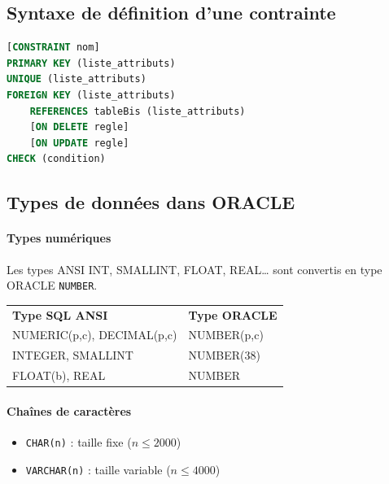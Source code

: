 \subsection*{Syntaxe de définition d’une contrainte}

\begin{sqlcodebox}
\begin{lstlisting}[language=SQL]
[CONSTRAINT nom]
PRIMARY KEY (liste_attributs)
UNIQUE (liste_attributs)
FOREIGN KEY (liste_attributs)
    REFERENCES tableBis (liste_attributs)
    [ON DELETE regle]
    [ON UPDATE regle]
CHECK (condition)
\end{lstlisting}
\end{sqlcodebox}


\subsection{Types de données dans ORACLE}

\paragraph{Types numériques}

Les types ANSI INT, SMALLINT, FLOAT, REAL… sont convertis en type ORACLE
\texttt{NUMBER}.

\begin{center}
\begin{tabular}{ll}
\textbf{Type SQL ANSI} & \textbf{Type ORACLE} \\
NUMERIC(p,c), DECIMAL(p,c) & NUMBER(p,c) \\
INTEGER, SMALLINT & NUMBER(38) \\
FLOAT(b), REAL & NUMBER \\
\end{tabular}
\end{center}

\paragraph{Chaînes de caractères}

\begin{itemize}
\item \texttt{CHAR(n)} : taille fixe ($n \leq 2000$)
\item \texttt{VARCHAR(n)} : taille variable ($n \leq 4000$)
\end{itemize}

